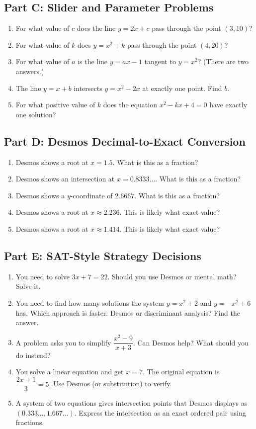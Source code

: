 \documentclass[14pt]{extarticle}
\begin{document}
\subsection*{Part C: Slider and Parameter Problems}
\begin{enumerate}
  \item For what value of \(c\) does the line \(y = 2x + c\) pass through the point \((3, 10)\)?
  \item For what value of \(k\) does \(y = x^2 + k\) pass through the point \((4, 20)\)?
  \item For what value of \(a\) is the line \(y = ax - 1\) tangent to \(y = x^2\)? (There are two answers.)
  \item The line \(y = x + b\) intersects \(y = x^2 - 2x\) at exactly one point. Find \(b\).
  \item For what positive value of \(k\) does the equation \(x^2 - kx + 4 = 0\) have exactly one solution?
\end{enumerate}

\subsection*{Part D: Desmos Decimal-to-Exact Conversion}
\begin{enumerate}
  \item Desmos shows a root at \(x = 1.5\). What is this as a fraction?
  \item Desmos shows an intersection at \(x = 0.8333...\). What is this as a fraction?
  \item Desmos shows a \(y\)-coordinate of \(2.6667\). What is this as a fraction?
  \item Desmos shows a root at \(x \approx 2.236\). This is likely what exact value?
  \item Desmos shows a root at \(x \approx 1.414\). This is likely what exact value?
\end{enumerate}

\subsection*{Part E: SAT-Style Strategy Decisions}
\begin{enumerate}
  \item You need to solve \(3x + 7 = 22\). Should you use Desmos or mental math? Solve it.
  \item You need to find how many solutions the system \(y = x^2 + 2\) and \(y = -x^2 + 6\) has. Which approach is faster: Desmos or discriminant analysis? Find the answer.
  \item A problem asks you to simplify \(\dfrac{x^2 - 9}{x + 3}\). Can Desmos help? What should you do instead?
  \item You solve a linear equation and get \(x = 7\). The original equation is \(\dfrac{2x + 1}{3} = 5\). Use Desmos (or substitution) to verify.
  \item A system of two equations gives intersection points that Desmos displays as \((0.333..., 1.667...)\). Express the intersection as an exact ordered pair using fractions.
\end{enumerate}
\end{document}
